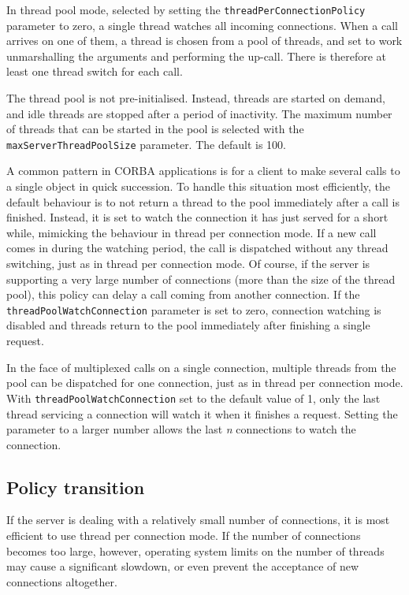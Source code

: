 \documentclass[11pt,twoside,a4paper]{book}
\newcommand{\code}[1]{\texttt{#1}}
\newcommand{\dsc}{\discretionary{}{}{}}
\begin{document}
In thread pool mode, selected by setting the
\code{threadPerConnectionPolicy} parameter to zero, a single thread
watches all incoming connections. When a call arrives on one of them,
a thread is chosen from a pool of threads, and set to work
unmarshalling the arguments and performing the up-call. There is
therefore at least one thread switch for each call.

The thread pool is not pre-initialised. Instead, threads are started
on demand, and idle threads are stopped after a period of inactivity.
The maximum number of threads that can be started in the pool is
selected with the \code{maxServerThreadPool\dsc{}Size} parameter. The
default is 100.

A common pattern in CORBA applications is for a client to make several
calls to a single object in quick succession. To handle this situation
most efficiently, the default behaviour is to not return a thread to
the pool immediately after a call is finished. Instead, it is set to
watch the connection it has just served for a short while, mimicking
the behaviour in thread per connection mode. If a new call comes in
during the watching period, the call is dispatched without any thread
switching, just as in thread per connection mode. Of course, if the
server is supporting a very large number of connections (more than the
size of the thread pool), this policy can delay a call coming from
another connection. If the \code{threadPoolWatch\dsc{}Connection}
parameter is set to zero, connection watching is disabled and threads
return to the pool immediately after finishing a single request.

In the face of multiplexed calls on a single connection, multiple
threads from the pool can be dispatched for one connection, just as in
thread per connection mode. With \code{threadPoolWatchConnection} set
to the default value of 1, only the last thread servicing a connection
will watch it when it finishes a request. Setting the parameter to a
larger number allows the last \emph{n} connections to watch the
connection.


\subsection{Policy transition}

If the server is dealing with a relatively small number of
connections, it is most efficient to use thread per connection mode.
If the number of connections becomes too large, however, operating
system limits on the number of threads may cause a significant
slowdown, or even prevent the acceptance of new connections
altogether.
\end{document}
